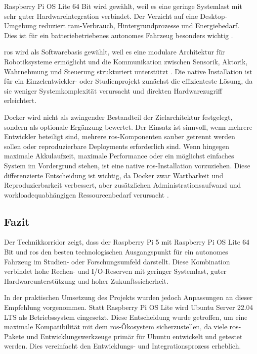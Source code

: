 Raspberry Pi OS Lite 64 Bit wird gewählt, weil es eine geringe Systemlast mit sehr guter Hardwareintegration verbindet. Der Verzicht auf eine Desktop-Umgebung reduziert \gls{ram}-Verbrauch, Hintergrundprozesse und Energiebedarf. Dies ist für ein batteriebetriebenes autonomes Fahrzeug besonders wichtig \cite[Abschnitte ``Raspberry Pi OS'' und ``Raspberry Pi OS Lite'']{zotero-item-149}.

\gls{ros} wird als Softwarebasis gewählt, weil es eine modulare Architektur für Robotiksysteme ermöglicht und die Kommunikation zwischen Sensorik, Aktorik, Wahrnehmung und Steuerung strukturiert unterstützt \cite{zotero-item-156}. Die native Installation ist für ein Einzelentwickler- oder Studienprojekt zunächst die effizienteste Lösung, da sie weniger Systemkomplexität verursacht und direkten Hardwarezugriff erleichtert.

Docker wird nicht als zwingender Bestandteil der Zielarchitektur festgelegt, sondern als optionale Ergänzung bewertet. Der Einsatz ist sinnvoll, wenn mehrere Entwickler beteiligt sind, mehrere \gls{ros}-Komponenten sauber getrennt werden sollen oder reproduzierbare Deployments erforderlich sind. Wenn hingegen maximale Akkulaufzeit, maximale Performance oder ein möglichst einfaches System im Vordergrund stehen, ist eine native \gls{ros}-Installation vorzuziehen. Diese differenzierte Entscheidung ist wichtig, da Docker zwar Wartbarkeit und Reproduzierbarkeit verbessert, aber zusätzlichen Administrationsaufwand und workloadequabhängigen Ressourcenbedarf verursacht \cite{gamessPerformanceEvaluationDocker2023} \cite{dockerinc.RuntimeMetrics}.

\subsection{Fazit}
\label{sec:fazit_technikkorridor}

Der Technikkorridor zeigt, dass der Raspberry Pi 5 mit Raspberry Pi OS Lite 64 Bit und \gls{ros} den besten technologischen Ausgangspunkt für ein autonomes Fahrzeug im Studien- oder Forschungsumfeld darstellt. Diese Kombination verbindet hohe Rechen- und I/O-Reserven mit geringer Systemlast, guter Hardwareunterstützung und hoher Zukunftssicherheit.

In der praktischen Umsetzung des Projekts wurden jedoch Anpassungen an dieser Empfehlung vorgenommen. Statt Raspberry Pi OS Lite wird Ubuntu Server 22.04 LTS als Betriebssystem eingesetzt. Diese Entscheidung wurde getroffen, um eine maximale Kompatibilität mit dem \gls{ros}-Ökosystem sicherzustellen, da viele \gls{ros}-Pakete und Entwicklungswerkzeuge primär für Ubuntu entwickelt und getestet werden. Dies vereinfacht den Entwicklungs- und Integrationsprozess erheblich.


